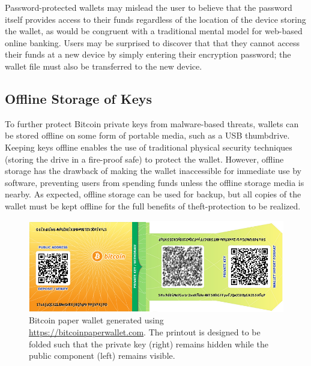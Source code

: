 
Password-protected wallets may mislead the user to believe that the password itself provides access to their funds regardless of the location of the device storing the wallet, as would be congruent with a traditional mental model for web-based online banking. Users may be surprised to discover that that they cannot access their funds at a new device by simply entering their encryption password; the wallet file must also be transferred to the new device. 

\subsection{Offline Storage of Keys}
\label{sec:offline storage}
To further protect Bitcoin private keys from malware-based threats, wallets can be stored offline on some form of portable media, such as a USB thumbdrive. Keeping keys offline enables the use of traditional physical security techniques (\eg storing the drive in a fire-proof safe) to protect the wallet. However, offline storage has the drawback of making the wallet inaccessible for immediate use by software, preventing users from spending funds unless the offline storage media is nearby. As expected, offline storage can be used for backup, but all copies of the wallet must be kept offline for the full benefits of theft-protection to be realized.

\begin{figure}[pt]
  \includegraphics[width=.48\textwidth]{figures/paperwallet.png}
  \caption{Bitcoin paper wallet generated using \url{https://bitcoinpaperwallet.com}. The printout is designed to be folded such that the private key (right) remains hidden while the public component (left) remains visible.}
  \label{fig:paperwallet}
\end{figure}

